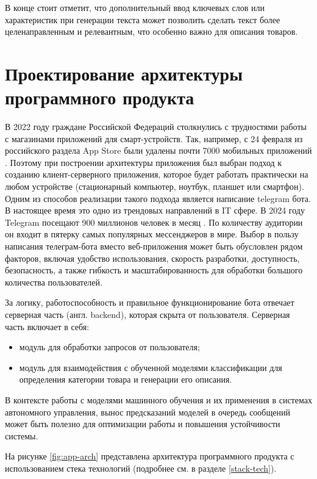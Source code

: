 \documentclass[a4paper,12pt]{extarticle}
\begin{document}
В конце стоит отметит, что дополнительный ввод ключевых слов или характеристик при генерации текста может позволить сделать текст более целенаправленным и релевантным, что особенно важно для описания товаров.

\newpage
\newpage
\section{Проектирование архитектуры программного продукта}
В 2022 году граждане Российской Федераций столкнулись с трудностями работы с магазинами приложений для смарт-устройств. Так, например, с 24 февраля из российского раздела App Store были удалены почти 7000 мобильных приложений \cite{russiaapp}. Поэтому при построении архитектуры приложения был выбран подход к созданию клиент-серверного приложения, которое будет работать практически на любом устройстве (стационарный компьютер, ноутбук, планшет или смартфон). Одним из способов реализации такого подхода является написание telegram  бота. В настоящее время это одно из трендовых направлений в IT сфере. В 2024 году Telegram посещают 900 миллионов человек в месяц \cite{telegram-stats}. По количеству аудитории он входит в пятерку самых популярных мессенджеров в мире. Выбор в пользу написания телеграм-бота вместо веб-приложения может быть обусловлен рядом факторов, включая удобство использования, скорость разработки, доступность, безопасность, а также гибкость и масштабированность для обработки большого количества пользователей.

За логику, работоспособность и правильное функционирование бота 
отвечает серверная часть (англ. backend), которая скрыта от пользователя. Серверная часть включает в себя:
\begin{itemize}
	\item модуль для обработки запросов от пользователя;
	\item модуль для взаимодействия с обученной моделями классификации для определения категории товара и генерации его описания.
\end{itemize}

В контексте работы с моделями машинного обучения и их применения в системах автономного управления, вынос предсказаний моделей в очередь сообщений может быть полезно для оптимизации работы и повышения устойчивости системы.

На рисунке \ref{fig:app-arch} представлена архитектура программного продукта с использованием стека технологий (подробнее см. в разделе \ref{stack-tech}).
\end{document}
